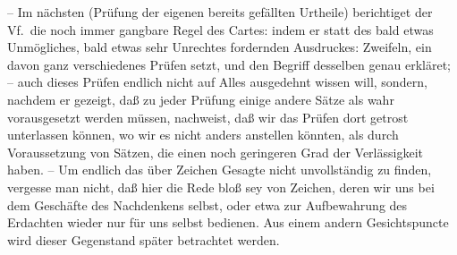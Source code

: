 {	}
-- Im nächsten  (Prüfung der eigenen bereits gefällten Urtheile) berichtiget der Vf.\ die noch immer gangbare Regel des Cartes:  indem er statt des bald etwas Unmögliches, bald etwas sehr Unrechtes fordernden Ausdruckes: Zweifeln, ein davon ganz verschiedenes Prüfen setzt, und den Begriff desselben genau erkläret; -- auch dieses Prüfen endlich nicht auf Alles ausgedehnt wissen will, sondern, nachdem er gezeigt, daß zu jeder Prüfung einige andere Sätze als wahr vorausgesetzt werden müssen, nachweist, daß wir das Prüfen dort getrost unterlassen können, wo wir es nicht anders anstellen könnten, als durch Voraussetzung von Sätzen, die einen noch geringeren Grad der Verlässigkeit haben. -- Um endlich das über Zeichen Gesagte  nicht unvollständig zu finden, vergesse man nicht, daß hier die Rede bloß sey von Zeichen, deren wir uns bei dem Geschäfte des Nachdenkens selbst, oder etwa zur Aufbewahrung des Erdachten wieder nur für uns selbst bedienen. Aus einem andern Gesichtspuncte wird dieser Gegenstand später betrachtet werden. \par 
